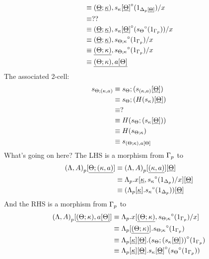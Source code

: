 \documentclass[10pt]{article}
\theoremstyle{definition}
\newcommand\TrCirc[2]{\ensuremath{{#1}^\circ(#2)}}
\begin{document}
\begin{enumerate}[style = multiline, labelwidth = 80pt]
\begin{align*}
&\equiv (\downstairs{\Theta} ; \downstairs{\kappa}) , \TrCirc{s_{\kappa}[\downstairs{\Theta}]}{1_{\asdep{\Delta}[\downstairs{\Theta}]}}/x \\
&\equiv ?? \\
&\equiv (\downstairs{\Theta}; \downstairs{\kappa}) , \TrCirc{s_{\kappa}[\downstairs{\Theta}]}{\TrCirc{s_{\Theta}}{1_{\asdep{\Gamma}}}} / x \\
&\equiv (\downstairs{\Theta}; \downstairs{\kappa}) , \TrCirc{s_{\Theta ; \kappa}}{1_{\asdep{\Gamma}}} / x \\
&\equiv \downstairs{(\Theta ; \kappa)} , \TrCirc{s_{\Theta ; \kappa}}{1_{\asdep{\Gamma}}} / x \\
&\equiv \downstairs{(\Theta ; \kappa) , a[\Theta] }
\end{align*}
The associated 2-cell:
\begin{align*}
s_{\Theta ; (\kappa , a)} 
&\equiv s_\Theta ; (s_{(\kappa , a)}[\underline{\Theta}]) \\
&\equiv s_\Theta ; (H(s_\kappa)[\underline{\Theta}]) \\
&\equiv ? \\
&\equiv H(s_{\Theta} ; (s_\kappa[\underline{\Theta}])) \\
&\equiv H(s_{\Theta ; \kappa}) \\
&\equiv s_{(\Theta ; \kappa) , a[\Theta]}
\end{align*}
What's going on here? The LHS is a morphism from ${\Gamma}_p$ to
\begin{align*}
\asdep{(\Lambda,A)}[\downstairs{\Theta ; (\kappa , a)}]
&\equiv \asdep{(\Lambda,A)}[\downstairs{(\kappa , a)}][\downstairs{\Theta}] \\
&\equiv \asdep{\Lambda}.x[\downstairs{\kappa} , \TrCirc{s_{\kappa}}{1_{\asdep{\Delta}}}/x][\downstairs{\Theta}] \\
&\equiv (\asdep{\Lambda}[\downstairs{\kappa}].\TrCirc{s_{\kappa}}{1_{\asdep{\Delta}}})[\downstairs{\Theta}] \\
\end{align*}
And the RHS is a morphism from ${\Gamma}_p$ to
\begin{align*}
\asdep{(\Lambda,A)}[\downstairs{(\Theta ; \kappa) , a[\Theta]}]
&\equiv \asdep{\Lambda}.x[\downstairs{(\Theta ; \kappa)}, \TrCirc{s_{\Theta ; \kappa}}{1_{\asdep{\Gamma}}}/x] \\
&\equiv \asdep{\Lambda}[\downstairs{(\Theta ; \kappa)}].\TrCirc{s_{\Theta ; \kappa}}{1_{\asdep{\Gamma}}} \\
&\equiv \asdep{\Lambda}[\downstairs{\kappa}][\downstairs{\Theta}].\TrCirc{(s_{\Theta} ; (s_\kappa[\downstairs{\Theta}]))}{1_{\asdep{\Gamma}}} \\
&\equiv \asdep{\Lambda}[\downstairs{\kappa}][\downstairs{\Theta}]. \TrCirc{s_\kappa[\downstairs{\Theta}]}{\TrCirc{s_{\Theta}}{1_{\asdep{\Gamma}}}}
\end{align*}


\end{enumerate}
\end{document}

